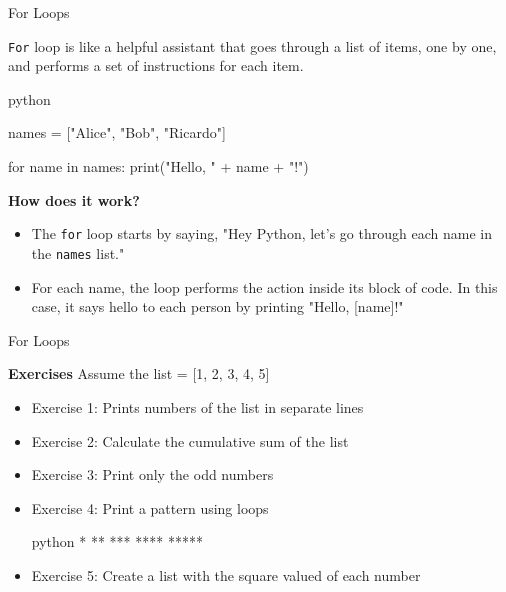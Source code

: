 \documentclass[
	11pt, 
]{beamer}
\begin{document}

\begin{frame}[fragile]{For Loops}

\texttt{For} loop is like a helpful assistant that goes through a list of items, one by one, and performs a set of instructions for each item.

\begin{mintedbox}{python}

names = ["Alice", "Bob", "Ricardo"]

for name in names:
    print("Hello, " + name + "!")

\end{mintedbox}

\begin{exampleblock}{\textbf{How does it work?}}
    \begin{itemize}
        \item The \texttt{for} loop starts by saying, "Hey Python, let's go through each name in the \texttt{names} list."
        \item For each name, the loop performs the action inside its block of code. In this case, it says hello to each person by printing "Hello, [name]!"
    \end{itemize}
\end{exampleblock}

\end{frame}


\begin{frame}[fragile]{For Loops}

\begin{alertblock}{\textbf{Exercises}}
Assume the list = [1, 2, 3, 4, 5]
\begin{itemize}
    \item Exercise 1: Prints numbers of the list in separate lines
    \item Exercise 2: Calculate the cumulative sum of the list
    \item Exercise 3: Print only the odd numbers
    \item Exercise 4: Print a pattern using loops
\begin{mintedbox}{python}
*
**
***
****
*****
\end{mintedbox}
    \item Exercise 5: Create a list with the square valued of each number
\end{itemize}    
\end{alertblock}

\end{frame}
\end{document}
